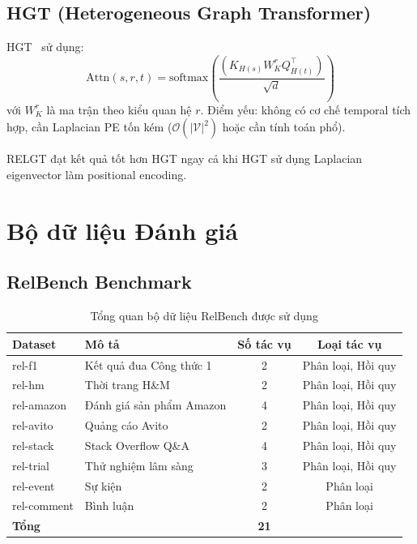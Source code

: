 \documentclass[12pt,a4paper]{article}
\begin{document}
\subsection{HGT (Heterogeneous Graph Transformer)}

HGT~\cite{hu2020hgt} sử dụng:
\begin{equation}
  \text{Attn}(s,r,t) = \text{softmax}\!\left(\frac{(K_{H(s)}W_K^{r} Q_{H(t)}^\top)}{\sqrt{d}}\right)
\end{equation}
với $W_K^r$ là ma trận theo kiểu quan hệ $r$. Điểm yếu: không có cơ chế temporal
tích hợp, cần Laplacian PE tốn kém ($\mathcal{O}(|\mathcal{V}|^2)$ hoặc cần
tính toán phổ).

RELGT đạt kết quả tốt hơn HGT ngay cả khi HGT sử dụng Laplacian eigenvector
làm positional encoding.

\section{Bộ dữ liệu Đánh giá}

\subsection{RelBench Benchmark}

\begin{table}[h!]
\centering
\caption{Tổng quan bộ dữ liệu RelBench được sử dụng}
\begin{tabular}{llcc}
\toprule
\textbf{Dataset} & \textbf{Mô tả} & \textbf{Số tác vụ} & \textbf{Loại tác vụ} \\
\midrule
rel-f1 & Kết quả đua Công thức 1 & 2 & Phân loại, Hồi quy \\
rel-hm & Thời trang H\&M & 2 & Phân loại, Hồi quy \\
rel-amazon & Đánh giá sản phẩm Amazon & 4 & Phân loại, Hồi quy \\
rel-avito & Quảng cáo Avito & 2 & Phân loại, Hồi quy \\
rel-stack & Stack Overflow Q\&A & 4 & Phân loại, Hồi quy \\
rel-trial & Thử nghiệm lâm sàng & 3 & Phân loại, Hồi quy \\
rel-event & Sự kiện & 2 & Phân loại \\
rel-comment & Bình luận & 2 & Phân loại \\
\midrule
\textbf{Tổng} & & \textbf{21} & \\
\bottomrule
\end{tabular}
\end{table}
\end{document}
